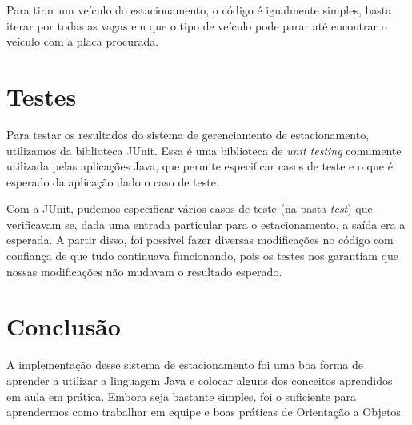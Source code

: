 \documentclass{article}
\begin{document}
Para tirar um veículo do estacionamento, o código é igualmente simples, basta iterar por todas as vagas em que o tipo de veículo pode parar até encontrar o veículo com a placa procurada.

\section{Testes}
Para testar os resultados do sistema de gerenciamento de estacionamento, utilizamos da biblioteca JUnit. Essa é uma biblioteca de \emph{unit testing} comumente utilizada pelas aplicações Java, que permite especificar casos de teste e o que é esperado da aplicação dado o caso de teste.

Com a JUnit, pudemos especificar vários casos de teste (na pasta \emph{test}) que verificavam se, dada uma entrada particular para o estacionamento, a saída era a esperada. A partir disso, foi possível fazer diversas modificações no código com confiança de que tudo continuava funcionando, pois os testes nos garantiam que nossas modificações não mudavam o resultado esperado.

\section{Conclusão}
A implementação desse sistema de estacionamento foi uma boa forma de aprender a utilizar a linguagem Java e colocar alguns dos conceitos aprendidos em aula em prática. Embora seja bastante simples, foi o suficiente para aprendermos como trabalhar em equipe e boas práticas de Orientação a Objetos.

\nocite{*}


\end{document}
